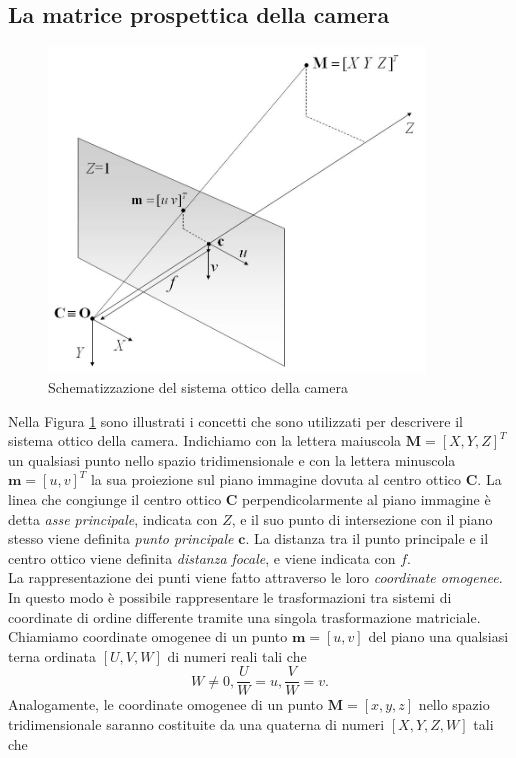 \subsection{La matrice prospettica della camera}
\begin{figure}[tb]
	\centering
	\includegraphics[width=10cm]{./pictures/modelloCamera}
	\caption{Schematizzazione del sistema ottico della camera}
	\label{fig:modelloCamera}
\end{figure} 
Nella Figura \ref{fig:modelloCamera} sono illustrati i concetti che sono utilizzati per descrivere il sistema ottico della camera.
Indichiamo con la lettera maiuscola $\textbf{M}=[X, Y, Z]^\textit{T}$ un qualsiasi punto nello spazio tridimensionale e con la lettera minuscola $\textbf{m} = [u, v]^\textit{T}$ la sua proiezione sul piano immagine dovuta al centro ottico $\textbf{C}$.
La linea che congiunge il centro ottico $\textbf{C}$ perpendicolarmente al piano immagine \`e detta \textit{asse principale}, indicata con $Z$, e il suo punto di intersezione con il piano stesso viene definita \textit{punto principale} $\textbf{c}$.
La distanza tra il punto principale e il centro ottico viene definita \textit{distanza focale},  e viene indicata con $f$.\\
La rappresentazione dei punti viene fatto attraverso le loro \textit{coordinate omogenee}.
In questo modo \`e possibile rappresentare le trasformazioni tra sistemi di coordinate di ordine differente tramite una singola trasformazione matriciale.
Chiamiamo coordinate omogenee di un punto $\textbf{m} = [u,v]$ del piano una qualsiasi terna ordinata $[U,V,W]$ di numeri reali tali che
\[W\neq 0,
\frac{U}{W}=u,
\frac{V}{W}=v.\]
Analogamente, le coordinate omogenee di un punto $\textbf{M}=[x,y,z]$ nello spazio tridimensionale saranno costituite da una quaterna di numeri $[X,Y,Z,W]$ tali che 
